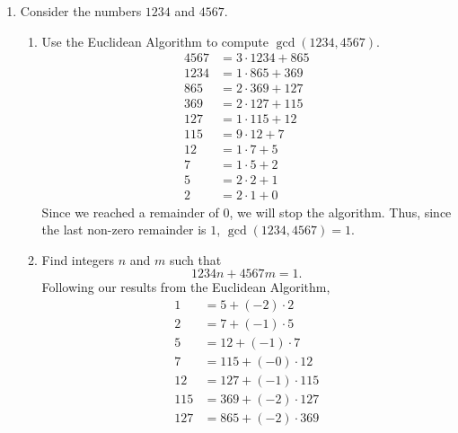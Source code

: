 \documentclass{article}
\begin{document}
\begin{enumerate}
    	\item Consider the numbers $1234$ and $4567$.
    		\begin{enumerate}
    			\item Use the Euclidean Algorithm to compute $\gcd(1234, 4567)$.
                        \begin{align*}
                            4567 &= 3 \cdot 1234 + 865 \\
                            1234 &= 1 \cdot 865  + 369 \\
                            865  &= 2 \cdot 369  + 127 \\
                            369  &= 2 \cdot 127  + 115 \\
                            127  &= 1 \cdot 115  + 12  \\
                            115  &= 9 \cdot 12   + 7   \\
                            12   &= 1 \cdot 7    + 5   \\
                            7    &= 1 \cdot 5    + 2   \\
                            5    &= 2 \cdot 2    + 1   \\
                            2    &= 2 \cdot 1    + 0   
                        \end{align*}
                        Since we reached a remainder of $0$, we will stop the algorithm. Thus, since the last non-zero remainder is $1$, $\gcd(1234, 4567) = 1$.
    			\item Find integers $n$ and $m$ such that
    				\[
    					1234n + 4567m = 1.
    				\]
                        Following our results from the Euclidean Algorithm,
                        \begin{align*}
                            1   &= 5    + (\minus2)\cdot 2    \\
                            2   &= 7    + (\minus1)\cdot 5    \\
                            5   &= 12   + (\minus1)\cdot 7    \\
                            7   &= 115  + (\minus0)\cdot 12   \\
                            12  &= 127  + (\minus1)\cdot 115  \\
                            115 &= 369  + (\minus2)\cdot 127  \\
                            127 &= 865  + (\minus2)\cdot 369  \\

\end{align*}
\end{enumerate}
\end{enumerate}
\end{document}
